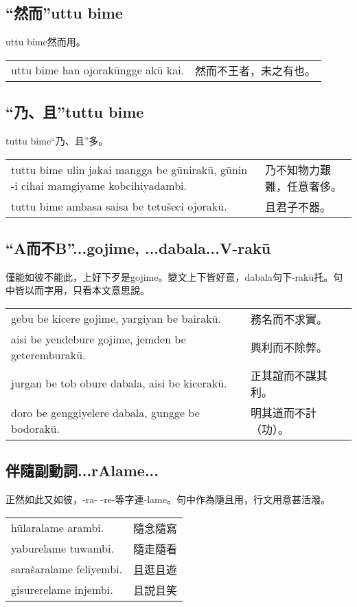 \documentclass{article}
\begin{document}
\subsection{“然而”uttu bime}
\noindent uttu bime然而用。
\begin{center}
    \begin{tabularx}{\textwidth}{XX}
        uttu bime han ojorak\={u}ngge ak\={u} kai. & 然而不王者，未之有也。
    \end{tabularx}
\end{center}

\subsection{“乃、且”tuttu bime}
\noindent tuttu bime“乃、且”多。
\begin{center}
    \begin{tabularx}{\textwidth}{XX}
        tuttu bime ulin jakai mangga be g\={u}nirak\={u}, g\={u}nin -i cihai mamgiyame kobcihiyadambi. & 乃不知物力艱難，任意奢侈。\\
        tuttu bime ambasa saisa be tetu\v{s}eci ojorak\={u}. & 且君子不器。
    \end{tabularx}
\end{center}

\subsection{“A而不B”...gojime, ...dabala...V-rak\={u}}
\noindent 僅能如彼不能此，上好下歹是gojime。變文上下皆好意，dabala句下-rak\={u}托。句中皆以而字用，只看本文意思說。
\begin{center}
    \begin{tabularx}{\textwidth}{XX}
        gebu be kicere gojime, yargiyan be bairak\={u}. & 務名而不求實。\\
        aisi be yendebure gojime, jemden be geteremburak\={u}. &興利而不除弊。\\
        jurgan be tob obure dabala, aisi be kicerak\={u}. & 正其誼而不謀其利。\\
        doro be genggiyelere dabala, gungge be bodorak\={u}. & 明其道而不計（功）。
    \end{tabularx}
\end{center}

\subsection{伴隨副動詞...rAlame...}
\noindent 正然如此又如彼，-ra- -re-等字連-lame。句中作為隨且用，行文用意甚活潑。
\begin{center}
    \begin{tabularx}{\textwidth}{XX}
        h\={u}laralame arambi. & 隨念隨寫\\
        yaburelame tuwambi. & 隨走隨看\\
        sara\v{s}aralame feliyembi. & 且逛且遊\\
        gisurerelame injembi. & 且説且笑
    \end{tabularx}
\end{center}
\end{document}
